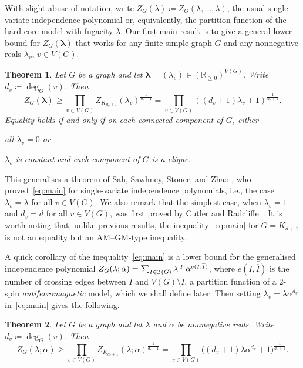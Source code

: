 \documentclass{article}
\numberwithin{equation}{section}
\theoremstyle{plain}
\newtheorem{theorem}{Theorem}[section]
\theoremstyle{definition}
\theoremstyle{remark} %
\DeclarePairedDelimiter{\abs}{\lvert}{\rvert}
\newcommand{\defeq}{\coloneqq}
\newcommand{\RR}{\mathbb{R}}
\newcommand{\calI}{\mathcal{I}}
\newcommand{\blambda}{\bm{\lambda}}
\begin{document}
With slight abuse of notation, write $Z_G(\lambda)\defeq Z_G(\lambda,\dots,\lambda)$, the usual single-variate independence polynomial or, equivalently, the partition function of the hard-core model with fugacity $\lambda$.
Our first main result is to give a general lower bound for $Z_G(\blambda)$ that works for any finite simple graph $G$ and any nonnegative reals $\lambda_v$, \(v\in V(G)\).

\begin{theorem}\label{thm:indep-poly-multiaff-lower-bd}
	Let \(G\) be a graph and let \(\blambda=(\lambda_v)\in (\RR_{\geq 0})^{V(G)}\). Write $d_v\defeq \deg_G(v)$. Then
	\begin{equation}\label{eq:main}
	    Z_G(\blambda) \ge \prod_{v \in V(G)} Z_{K_{d_v+1}}(\lambda_v)^{\frac{1}{d_v+1}}
		= \prod_{v \in V(G)} ( (d_v+1)\lambda_v + 1 )^{\frac{1}{d_v+1}}.
	\end{equation}
    Equality holds if and only if on each connected component of \(G\), either
    \begin{enumerate*}
        \item all \(\lambda_v=0\) or 
        \item \(\lambda_v\) is constant and each component of $G$ is a clique.
    \end{enumerate*}
\end{theorem}

This generalises a theorem of Sah, Sawhney, Stoner, and Zhao \cite[Theorem~1.7]{sah2019number}, who proved~\eqref{eq:main} for single-variate independence polynomials, i.e., the case $\lambda_v=\lambda$ for all $v\in V(G)$. We also remark that the simplest case, when $\lambda_v=1$ and $d_v=d$ for all $v\in V(G)$, was first proved by Cutler and Radcliffe~\cite[Corollary~2.3]{cutler2017maximum}.
It is worth noting that, unlike previous results, the inequality~\eqref{eq:main} for $G=K_{d+1}$ is not an equality but an AM--GM-type inequality.

A quick corollary of the inequality~\eqref{eq:main} is a lower bound for the generalised independence polynomial $Z_{G}(\lambda;\alpha)=\sum_{I\in\calI(G)}\lambda^{\abs{I}}\alpha^{e(I,\overline{I})}$,
where $e(I,\overline{I})$ is the number of crossing edges between $I$ and $V(G)\setminus I$, a partition function of a \(2\)-spin \emph{antiferromagnetic} model, which we shall define later.
Then setting $\lambda_v=\lambda \alpha^{d_v}$ in~\eqref{eq:main} gives the following.

\begin{theorem}\label{thm:2spin}
    Let \(G\) be a graph and let \(\lambda\) and $\alpha$ be nonnegative reals. Write $d_v\defeq \deg_G(v)$. Then
	\[
	    Z_G(\lambda;\alpha) \ge \prod_{v \in V(G)} Z_{K_{d_v+1}}(\lambda;\alpha)^{\frac{1}{d_v+1}}
		= \prod_{v \in V(G)} \bigl( (d_v+1)\lambda\alpha^{d_v} + 1 \bigr)^{\frac{1}{d_v+1}}.
	\]
\end{theorem}
\end{document}

